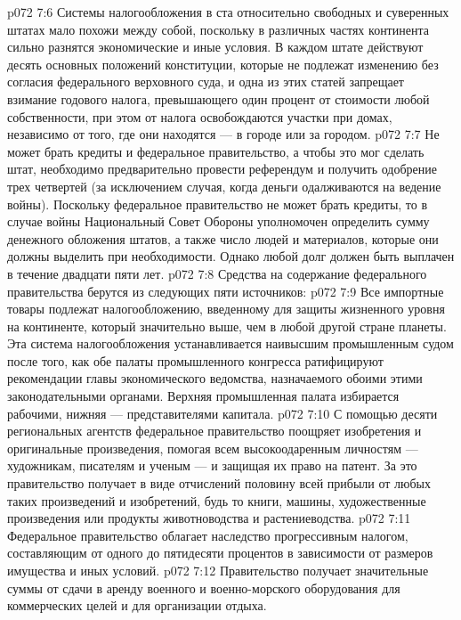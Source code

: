 \vs p072 7:6 \pc Системы налогообложения в ста относительно свободных и суверенных штатах мало похожи между собой, поскольку в различных частях континента сильно разнятся экономические и иные условия. В каждом штате действуют десять основных положений конституции, которые не подлежат изменению без согласия федерального верховного суда, и одна из этих статей запрещает взимание годового налога, превышающего один процент от стоимости любой собственности, при этом от налога освобождаются участки при домах, независимо от того, где они находятся --- в городе или за городом.
\vs p072 7:7 Не может брать кредиты и федеральное правительство, а чтобы это мог сделать штат, необходимо предварительно провести референдум и получить одобрение трех четвертей (за исключением случая, когда деньги одалживаются на ведение войны). Поскольку федеральное правительство не может брать кредиты, то в случае войны Национальный Совет Обороны уполномочен определить сумму денежного обложения штатов, а также число людей и материалов, которые они должны выделить при необходимости. Однако любой долг должен быть выплачен в течение двадцати пяти лет.
\vs p072 7:8 \pc Средства на содержание федерального правительства берутся из следующих пяти источников:
\vs p072 7:9 \bibnobreakspace {} Все импортные товары подлежат налогообложению, введенному для защиты жизненного уровня на континенте, который значительно выше, чем в любой другой стране планеты. Эта система налогообложения устанавливается наивысшим промышленным судом после того, как обе палаты промышленного конгресса ратифицируют рекомендации главы экономического ведомства, назначаемого обоими этими законодательными органами. Верхняя промышленная палата избирается рабочими, нижняя --- представителями капитала.
\vs p072 7:10 \bibnobreakspace {} С помощью десяти региональных агентств федеральное правительство поощряет изобретения и оригинальные произведения, помогая всем высокоодаренным личностям --- художникам, писателям и ученым --- и защищая их право на патент. За это правительство получает в виде отчислений половину всей прибыли от любых таких произведений и изобретений, будь то книги, машины, художественные произведения или продукты животноводства и растениеводства.
\vs p072 7:11 \bibnobreakspace {} Федеральное правительство облагает наследство прогрессивным налогом, составляющим от одного до пятидесяти процентов в зависимости от размеров имущества и иных условий.
\vs p072 7:12 \bibnobreakspace {} Правительство получает значительные суммы от сдачи в аренду военного и военно\hyp{}морского оборудования для коммерческих целей и для организации отдыха.
